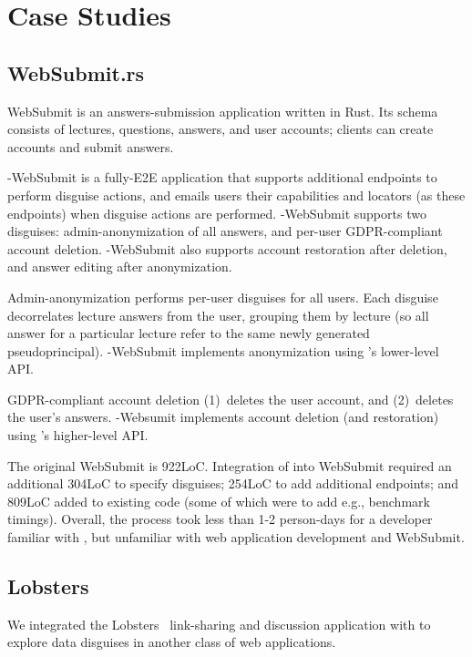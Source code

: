 \section{Case Studies}

\subsection{WebSubmit.rs}
WebSubmit is an answers-submission application written in Rust. 
Its schema consists of lectures, questions, answers, and user accounts; 
clients can create accounts and submit answers. 

\sys-WebSubmit is a fully-E2E application that supports additional endpoints to perform disguise
actions, and emails users their capabilities and locators (as these endpoints) when disguise actions
are performed. \sys-WebSubmit supports two disguises: admin-anonymization of all answers, and
per-user GDPR-compliant account deletion. \sys-WebSubmit also supports account restoration after
deletion, and answer editing after anonymization.  

Admin-anonymization performs per-user disguises for all users.
Each disguise decorrelates lecture answers from the user, grouping them by lecture (so all answer
for a particular lecture refer to the same newly generated pseudoprincipal).
\sys-WebSubmit implements anonymization using \sys's lower-level API.

GDPR-compliant account deletion 
%
(1)~deletes the user account, and 
%
(2)~deletes the user's answers. 
\sys-Websumit implements account deletion (and restoration) using \sys's higher-level API.

The original WebSubmit is 922LoC. Integration of \sys into WebSubmit required an additional 304LoC
to specify disguises; 254LoC to add additional endpoints; and 809LoC added to existing code (some of
which were to add e.g., benchmark timings). Overall, the process took less than 1-2 person-days for
a developer familiar with \sys, but unfamiliar with web application development and
WebSubmit.

\subsection{Lobsters} 
We integrated the Lobsters~\cite{lobsters} link-sharing and discussion
application with \sys to explore data disguises in another class of web applications.

